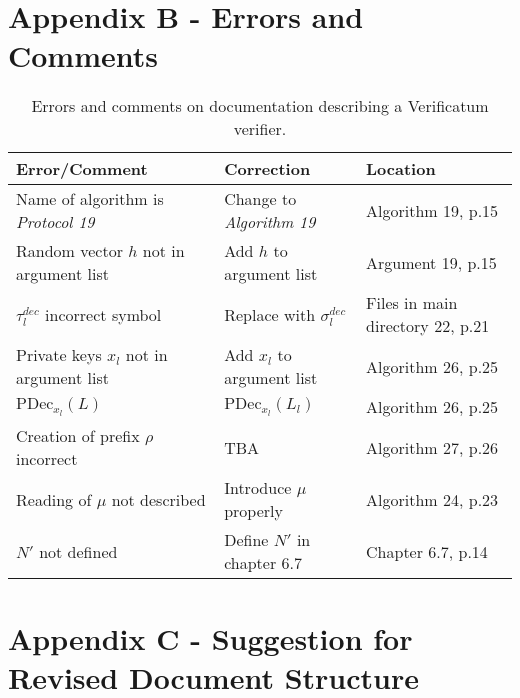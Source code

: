 \clearpage
\section{Appendix B - Errors and Comments}

\begin{table}[h!]
\begin{tabular}{| p{3.5cm} | p{3.5cm} | p{3.5cm} |}
  \hline \bf{Error/Comment} & \bf{Correction} & \bf{Location} \\ \hline \hline

 Name of algorithm is
  \emph{Protocol 19} & Change to \emph{Algorithm 19} & Algorithm 19,
  p.15 \\ \hline

  Random vector $h$ not in argument list & Add $h$ to argument list &
  Argument 19, p.15 \\ \hline

  $\tau_l^{dec}$ incorrect symbol & Replace with $\sigma_l^{dec}$ &
  Files in main directory 22, p.21 \\ \hline

  Private keys $x_l$ not in argument list & Add $x_l$ to
  argument list & Algorithm 26, p.25 \\ \hline

  $\mathrm{PDec}_{x_l}(L)$ & $\mathrm{PDec}_{x_l}(L_l)$ & Algorithm
  26, p.25 \\ \hline

  Creation of prefix $\rho$ incorrect & TBA & Algorithm 27, p.26
  \\ \hline

  Reading of $\mu$ not described & Introduce $\mu$ properly & Algorithm 24, p.23 \\ \hline
  
  $N'$ not defined & Define $N'$ in chapter 6.7 & Chapter 6.7, p.14 \\ \hline

\end{tabular}
\caption{Errors and comments on documentation describing a Verificatum verifier.}

\end{table}

\clearpage
\section{Appendix C - Suggestion for Revised Document Structure}

